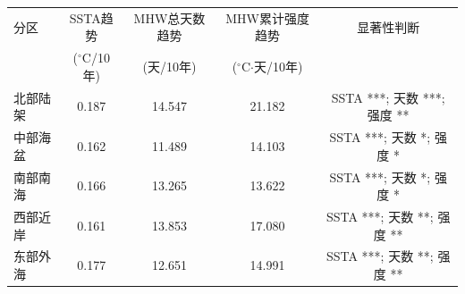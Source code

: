 \begin{tabular}{lcccc}
\hline
分区 & SSTA趋势 & MHW总天数趋势 & MHW累计强度趋势 & 显著性判断 \\
 & ($^\circ$C/10年) & (天/10年) & ($^\circ$C$\cdot$天/10年) &  \\
\hline
北部陆架 & 0.187 & 14.547 & 21.182 & SSTA ***; 天数 ***; 强度 ** \\
中部海盆 & 0.162 & 11.489 & 14.103 & SSTA ***; 天数 *; 强度 * \\
南部南海 & 0.166 & 13.265 & 13.622 & SSTA ***; 天数 *; 强度 * \\
西部近岸 & 0.161 & 13.853 & 17.080 & SSTA ***; 天数 **; 强度 ** \\
东部外海 & 0.177 & 12.651 & 14.991 & SSTA ***; 天数 **; 强度 ** \\
\hline
\end{tabular}
